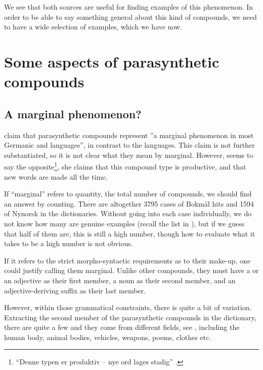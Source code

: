 \documentclass[output=paper]{LSP/langsci}
\begin{document}
We see that both sources are useful for finding examples of this phenomenon. In order to be able to say something general about this kind of compounds, we need to have a wide selection of examples, which we have now.

\section{Some aspects of parasynthetic compounds}\label{sec:bondi:3}

\subsection{A marginal phenomenon?} 

\citet[200]{MelloniBisetto2010} claim that parasynthetic compounds represent ”a marginal phenomenon in most Germanic and  languages”, in contrast to the  languages. This claim is not further substantiated, so it is not clear what they mean by marginal. However, \citet[77]{Johannessen2001} seems to say the opposite\footnote{“Denne typen er produktiv – nye ord lages stadig” \citep[77]{Johannessen2001}.}, she claims that this compound type is productive, and that new words are made all the time. 

If “marginal” refers to quantity, the total number of compounds, we should find an answer by counting.  There are altogether 3795 cases of Bokmål hits and 1594 of Nynorsk in the dictionaries. Without going into each case individually, we do not know how many are genuine examples (recall the list in ), but if we guess that half of them are, this is still a high number, though how to evaluate what it takes to be a high number is not obvious.

If it refers to the strict morpho-syntactic requirements as to their make-up, one could justify calling them marginal. Unlike other compounds, they must have a  or an adjective as their first member, a noun as their second member, and an adjective-deriving suffix as their last member. 

However, within those grammatical constraints, there is quite a bit of variation. Extracting the second member of the parasynthetic compounds in the dictionary, there are quite a few and they come from different  fields, see , including the human body, animal bodies, vehicles, weapons, poems, clothes etc.  

\ea%
    \label{ex:bondi:8} 
\end{document}
